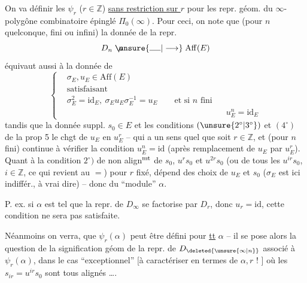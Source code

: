 On va  définir les $\psi_r$ ($r\in\mathbb Z$) \uline{sans restriction sur $r$} pour les repr.
géom. du $\infty$-polygône combinatoire épinglé $\Pi_0(\infty)$. Pour ceci, on note que   (pour $n$ quelconque, fini ou infini) la donnée de la repr.
\[
D_n\mathrel{\makebox[0pt][l]{\makebox[1.35em]{$\rho$}}\unsure{\rule{1.35em}{0.4pt}|\longrightarrow}}\mathrm{Aff}(E)
\]
équivaut aussi à la donnée de
\[
\left\{\begin{aligned}
&\sigma_E,u_E\in\mathrm{Aff}(E)\\
&\text{satisfaisant}\\
&\sigma_E^2= \mathrm{id}_E,\ \sigma_Eu_E\sigma_E^{-1}=u_E
\qquad\text{et si $n$ fini}\\[-2pt]
&\hspace{19em}u_E^n=\mathrm{id}_E
\end{aligned}\right.\tag*{(28)}
\]
tandis que la donnée suppl. $s_0\in E$ et les conditions $(\unsure{2^\circ|3^\circ})$ et $(4^\circ)$  de la prop 5    le chgt de $u_E$ en $u_E^r$ -- qui a un sens quel que soit $r\in\mathbb Z$, et (pour $n$ fini) continue à vérifier la condition $u_E^n=\mathrm{id}$ (après remplacement de $u_E$ par $u_E^r$).  Quant à la condition $2^\circ)$ de non align$^{\rm mt}$ de $s_0$, $u^rs_0$ et $u^{2r}s_0$ (ou de tous les $u^{ir}s_0$, $i\in\mathbb Z$, ce qui revient au $=$)
 pour $r$ fixé,   dépend des  choix de $u_E$ et $s_0$ ($\sigma_E$ est ici indiffér., à vrai dire) -- donc du ``module'' $\alpha$.

 P. ex. si  $\alpha$ est tel que la repr. de $D_\infty$ se factorise par $D_r$, donc $u_r=\mathrm{id}$, cette condition ne sera pas satisfaite.

Néanmoins on verra,  que $\psi_r(\alpha)$ peut être défini pour \uline{tt} $\alpha$ -- il se pose alors la question de la signification géom de  la repr. de $D_{\deleted{\unsure{\infty|n}}}$ associé à $\psi_r(\alpha)$, dans le cas ``exceptionnel'' [à caractériser en termes de $\alpha,r$ ! ] où les $s_{ir}=u^{ir}s_0$ sont tous alignés \ldots.

